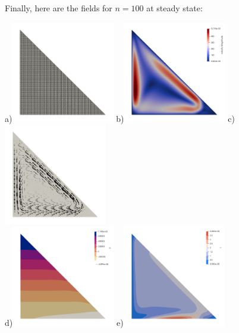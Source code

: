 Finally, here are the fields for $n=100$ at steady state:

\begin{center}
a)\includegraphics[width=4.5cm]{python_codes/fieldstone_51/images/relax0p20_100/grid}
b)\includegraphics[width=4.5cm]{python_codes/fieldstone_51/images/relax0p20_100/vel}
c)\includegraphics[width=4.5cm]{python_codes/fieldstone_51/images/relax0p20_100/vel2}\\
d)\includegraphics[width=4.5cm]{python_codes/fieldstone_51/images/relax0p20_100/p}
e)\includegraphics[width=4.5cm]{python_codes/fieldstone_51/images/relax0p20_100/T}

\end{center}

